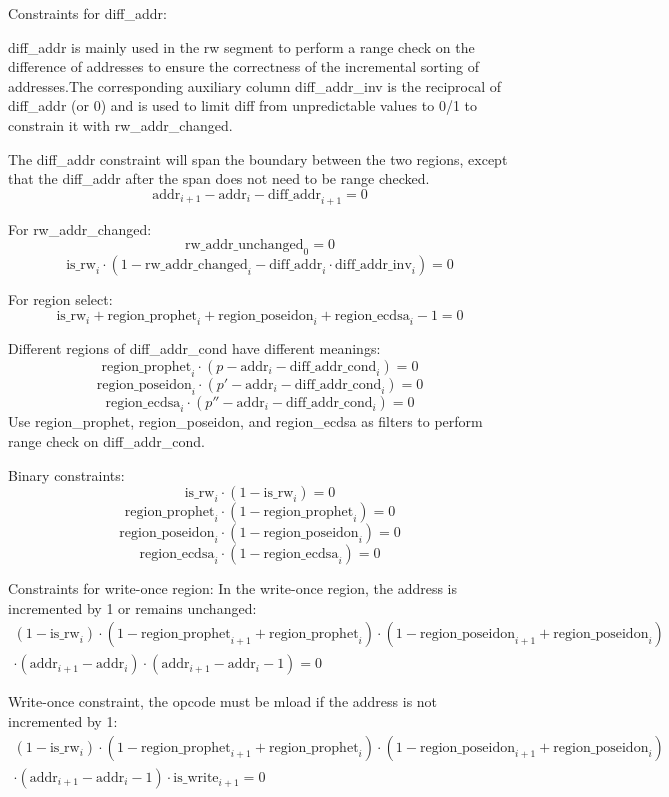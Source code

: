 Constraints for diff\_addr:

diff\_addr is mainly used in the rw segment to perform a range check on the difference of addresses to ensure the correctness of the incremental sorting of addresses.The corresponding auxiliary
column diff\_addr\_inv is the reciprocal of diff\_addr (or 0) and is used to limit diff from unpredictable values to 0/1 to constrain it with rw\_addr\_changed.

The diff\_addr constraint will span the boundary between the two regions, except that the diff\_addr after the span does not need to be range checked.
\[ \mathrm{addr}_{i+1} - \mathrm{addr}_i - \mathrm{diff\_addr}_{i+1} = 0 \]

For rw\_addr\_changed:
\[ \mathrm{rw\_addr\_unchanged}_0 = 0 \]
\[ \mathrm{is\_rw}_i \cdot (1 - \mathrm{rw\_addr\_changed}_i - \mathrm{diff\_addr}_i \cdot \mathrm{diff\_addr\_inv}_i) = 0 \]

For region select:
\[ \mathrm{is\_rw}_i + \mathrm{region\_prophet}_i + \mathrm{region\_poseidon}_i + \mathrm{region\_ecdsa}_i - 1 = 0 \]

Different regions of diff\_addr\_cond have different meanings:
\[ \mathrm{region\_prophet}_i \cdot (p - \mathrm{addr}_i - \mathrm{diff\_addr\_cond}_i) = 0 \]
\[ \mathrm{region\_poseidon}_i \cdot (p'- \mathrm{addr}_i - \mathrm{diff\_addr\_cond}_i) = 0 \]
\[ \mathrm{region\_ecdsa}_i \cdot (p'' - \mathrm{addr}_i - \mathrm{diff\_addr\_cond}_i) = 0 \]
Use region\_prophet, region\_poseidon, and region\_ecdsa as filters to perform range check on diff\_addr\_cond.

Binary constraints:
\[ \mathrm{is\_rw}_i \cdot (1 - \mathrm{is\_rw}_i) = 0 \]
\[ \mathrm{region\_prophet}_i \cdot (1 - \mathrm{region\_prophet}_i) = 0 \]
\[ \mathrm{region\_poseidon}_i \cdot (1 - \mathrm{region\_poseidon}_i)=0 \]
\[ \mathrm{region\_ecdsa}_i \cdot (1 - \mathrm{region\_ecdsa}_i)= 0 \]

Constraints for write-once region:
In the write-once region, the address is incremented by 1 or remains unchanged:
\begin{multline*}
    (1-\mathrm{is\_rw}_i) \cdot (1-\mathrm{region\_prophet}_{i+1}+\mathrm{region\_prophet}_i) \cdot (1-\mathrm{region\_poseidon}_{i+1}+\mathrm{region\_poseidon}_i) \\
    \cdot (\mathrm{addr}_{i+1}-\mathrm{addr}_i) \cdot (\mathrm{addr}_{i+1}-\mathrm{addr}_i-1)=0
\end{multline*}

Write-once constraint, the opcode must be mload if the address is not incremented by 1:
\begin{multline*}
    (1-\mathrm{is\_rw}_i) \cdot (1-\mathrm{region\_prophet}_{i+1}+\mathrm{region\_prophet}_i) \cdot (1-\mathrm{region\_poseidon}_{i+1}+\mathrm{region\_poseidon}_i) \\
    \cdot (\mathrm{addr}_{i+1}-\mathrm{addr}_i-1) \cdot \mathrm{is\_write}_{i+1}=0
\end{multline*}

